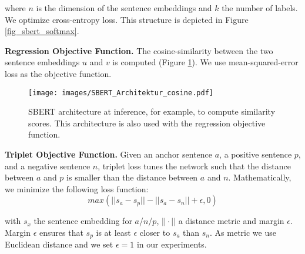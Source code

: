 \documentclass[11pt,a4paper]{article}
\begin{document}
where $n$ is the dimension of the sentence embeddings and $k$ the number of labels. We optimize cross-entropy loss. This structure is depicted in Figure \ref{fig_sbert_softmax}.

\textbf{Regression Objective Function.} The cosine-similarity between the two sentence embeddings $u$ and $v$ is computed (Figure \ref{fig_sbert_cosine}). We use mean-squared-error loss as the objective function.



\begin{figure}[t]
	\centering
	\texttt{[image: images/SBERT\_Architektur\_cosine.pdf]}
	\caption{SBERT architecture at inference, for example, to compute similarity scores. This architecture is also used with the regression objective function.}
	\label{fig_sbert_cosine}
\end{figure}

\textbf{Triplet Objective Function.} Given an anchor sentence $a$, a positive sentence $p$, and a negative sentence $n$, triplet loss tunes the network such that the distance between $a$ and $p$ is smaller than the distance between $a$ and $n$. Mathematically, we minimize the following loss function:
$$max(||s_a-s_p|| - ||s_a-s_n|| + \epsilon, 0)$$

with $s_x$ the sentence embedding for $a$/$n$/$p$, $||\cdot||$ a distance metric and margin $\epsilon$. Margin $\epsilon$ ensures that $s_p$ is at least $\epsilon$ closer to $s_a$ than $s_n$. As metric we use Euclidean distance and we set $\epsilon=1$ in our experiments. 
\end{document}
